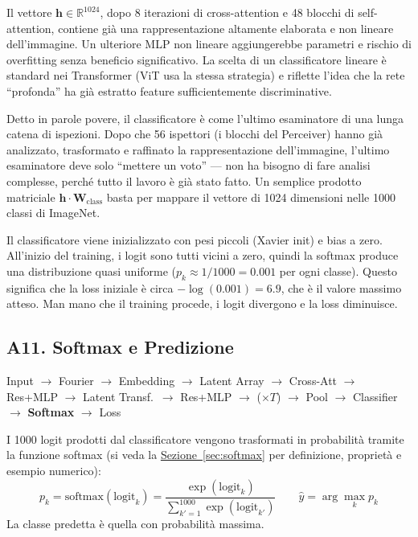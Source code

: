 \documentclass[12pt,a4paper]{article}
\begin{document}
Il vettore $\mathbf{h} \in \mathbb{R}^{1024}$, dopo 8 iterazioni di cross-attention e 48 blocchi di self-attention, contiene gi\`a una rappresentazione altamente elaborata e non lineare dell'immagine. Un ulteriore MLP non lineare aggiungerebbe parametri e rischio di overfitting senza beneficio significativo. La scelta di un classificatore lineare \`e standard nei Transformer (ViT usa la stessa strategia) e riflette l'idea che la rete ``profonda'' ha gi\`a estratto feature sufficientemente discriminative.

\begin{notabox}
Detto in parole povere, il classificatore \`e come l'ultimo esaminatore di una lunga catena di ispezioni. Dopo che 56 ispettori (i blocchi del Perceiver) hanno gi\`a analizzato, trasformato e raffinato la rappresentazione dell'immagine, l'ultimo esaminatore deve solo ``mettere un voto'' --- non ha bisogno di fare analisi complesse, perch\'e tutto il lavoro \`e gi\`a stato fatto. Un semplice prodotto matriciale $\mathbf{h} \cdot \mathbf{W}_{\text{class}}$ basta per mappare il vettore di 1024 dimensioni nelle 1000 classi di ImageNet.
\end{notabox}

\begin{notabox}
Il classificatore viene inizializzato con pesi piccoli (Xavier init) e bias a zero. All'inizio del training, i logit sono tutti vicini a zero, quindi la softmax produce una distribuzione quasi uniforme ($p_k \approx 1/1000 = 0.001$ per ogni classe). Questo significa che la loss iniziale \`e circa $-\log(0.001) = 6.9$, che \`e il valore massimo atteso. Man mano che il training procede, i logit divergono e la loss diminuisce.
\end{notabox}


\subsection{A11. Softmax e Predizione} \label{sec:softmax_forward}

\begin{pipelinebox}
Input $\to$ Fourier $\to$ Embedding $\to$ Latent Array $\to$ Cross-Att $\to$ Res+MLP $\to$ Latent Transf.\ $\to$ Res+MLP $\to$ ($\times T$) $\to$ Pool $\to$ Classifier $\to$ \textbf{Softmax} $\to$ Loss
\end{pipelinebox}

I 1000 logit prodotti dal classificatore vengono trasformati in probabilit\`a tramite la funzione softmax (si veda la \hyperref[sec:softmax]{Sezione~\ref*{sec:softmax}} per definizione, propriet\`a e esempio numerico):
\[
    p_k = \text{softmax}(\text{logit}_k) = \frac{\exp(\text{logit}_k)}{\sum_{k'=1}^{1000} \exp(\text{logit}_{k'})} \qquad \hat{y} = \arg\max_k p_k
\]
La classe predetta \`e quella con probabilit\`a massima.
\end{document}
